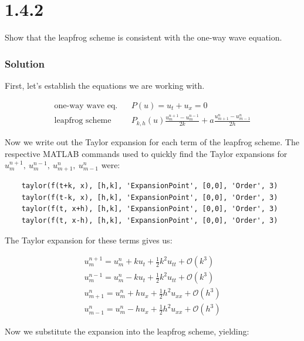 \documentclass[12pt]{article}
\begin{document}
\pagebreak

\section*{1.4.2}

Show that the leapfrog scheme is consistent with the one-way wave equation.

\subsubsection*{Solution}

First, let's establish the equations we are working with. 

\begin{equation*}
\begin{aligned}
 \text{one-way wave eq.}~~~~ & P(u) = u_t + u_x = 0 \\
 \text{leapfrog scheme} ~~~~~~& P_{k,h}(u)\frac{u_m^{n+1} - u_m^{n-1}}{2k} + a\frac{u_{m+1}^n - u^n_{m-1}}{2h}
\end{aligned}
\end{equation*}

Now we write out the Taylor expansion for each term of the leapfrog scheme. The respective MATLAB commands used to quickly find the Taylor expansions for $u_m^{n+1}, ~u_m^{n-1}, ~u_{m+1}^n, ~u_{m-1}^n$ were:

\begin{verbatim}
	taylor(f(t+k, x), [h,k], 'ExpansionPoint', [0,0], 'Order', 3)
	taylor(f(t-k, x), [h,k], 'ExpansionPoint', [0,0], 'Order', 3)
	taylor(f(t, x+h), [h,k], 'ExpansionPoint', [0,0], 'Order', 3)
	taylor(f(t, x-h), [h,k], 'ExpansionPoint', [0,0], 'Order', 3)
\end{verbatim}

The Taylor expansion for these terms gives us:

\begin{equation*}
\begin{aligned}
	u_m^{n+1} = u_m^n + ku_t + \frac{1}{2}k^2u_{tt} + \mathcal{O}(k^3)\\
	u_m^{n-1} = u_m^n - ku_t + \frac{1}{2}k^2u_{tt} + \mathcal{O}(k^3)\\
	u_{m+1}^n = u_m^n + hu_x + \frac{1}{2}h^2u_{xx} + \mathcal{O}(h^3)\\
	u_{m-1}^n = u_m^n - hu_x + \frac{1}{2}h^2u_{xx} + \mathcal{O}(h^3)
\end{aligned}
\end{equation*}

Now we substitute the expansion into the leapfrog scheme, yielding:
\end{document}
